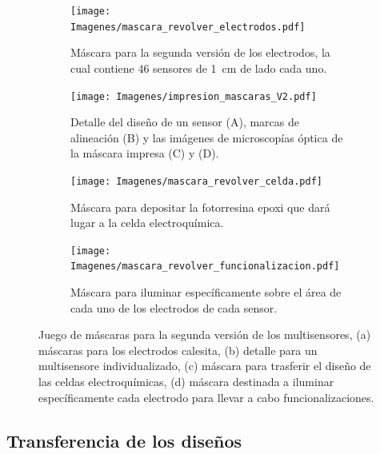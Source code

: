 				 		\begin{figure}[ht!]
			 	   	    \centering
			 	   	    \begin{subfigure}[t]{0.495\textwidth}
			        	\texttt{[image: Imagenes/mascara\_revolver\_electrodos.pdf]}
			       		\caption{Máscara para la segunda versión de los electrodos, la cual contiene 46 sensores de \SI{1}{cm} de lado cada uno.}
			         	\label{fig:mascara_v2}
			     		\end{subfigure}
			     		\begin{subfigure}[t]{0.495\textwidth}
			     		\texttt{[image: Imagenes/impresion\_mascaras\_V2.pdf]}
			    		\caption{Detalle del diseño de un sensor (A), marcas de alineación (B) y las imágenes de microscopías óptica de la máscara impresa (C) y (D).}
			    		\label{fig:impresion_diseno_v2_b}	
						\end{subfigure}
			     		\begin{subfigure}[t]{0.495\textwidth}
			         	\vspace*{1mm}
			         	\texttt{[image: Imagenes/mascara\_revolver\_celda.pdf]}
			        	\caption{Máscara para depositar la fotorresina epoxi que dará lugar a la celda electroquímica.}
			         	\label{fig:mascara_su8}
			     		\end{subfigure}
						\begin{subfigure}[t]{0.495\textwidth}
			     		\vspace*{1mm}
			     		\texttt{[image: Imagenes/mascara\_revolver\_funcionalizacion.pdf]}
			        	\caption{Máscara para iluminar específicamente sobre el área de cada uno de los electrodos de cada sensor.}
			         	\label{fig:mascara_funcionalizacion}
			     		\end{subfigure}
			     		\caption[Juego de máscara. Segunda versión]{Juego de máscaras para la segunda versión de los multisensores, (a) máscaras  para los electrodos calesita, (b) detalle para un multisensore individualizado, (c) máscara para trasferir el diseño de las celdas electroquímicas, (d) máscara destinada a iluminar específicamente cada electrodo para llevar a cabo funcionalizaciones.}
			     		\label{fig:impresion_diseno_V2}
			     		\vspace*{3mm}
			     	   	\end{figure}

	\subsection{Transferencia de los diseños}


